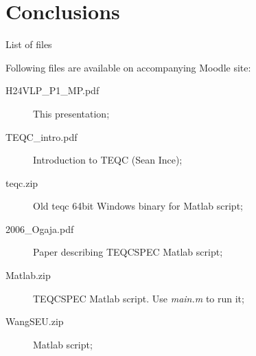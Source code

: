 \documentclass[11pt]{beamer}
\begin{document}
\section{Conclusions}


	\begin{frame}{List of files}
			
		Following files are available on accompanying Moodle site:

		\begin{description}
		\item[H24VLP\_P1\_MP.pdf] This presentation;
		\item[TEQC\_intro.pdf] Introduction to TEQC (Sean Ince);
		\item[teqc.zip] Old teqc 64bit Windows binary for Matlab script;
		\item[2006\_Ogaja.pdf] Paper describing TEQCSPEC Matlab script;
		\item[Matlab.zip] TEQCSPEC Matlab script. Use \textit{main.m} to run it;
		\item[WangSEU.zip] Matlab script;
	\end{description}

	\end{frame}


\end{document}
